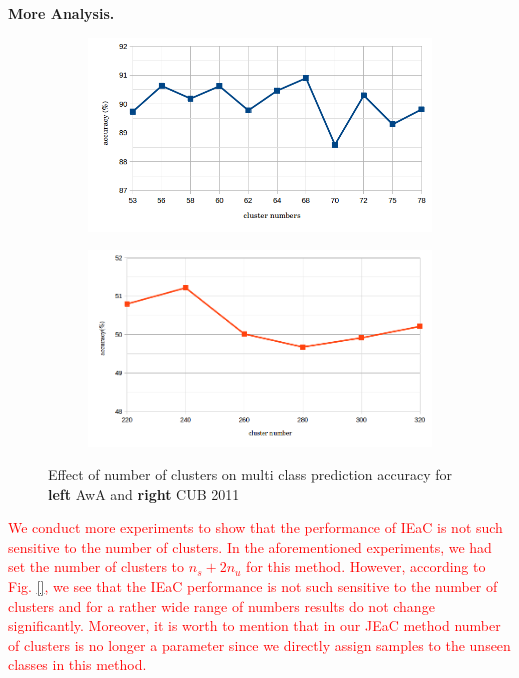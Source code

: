 \documentclass[10pt,twocolumn,letterpaper]{article}
\begin{document}
\textbf{More Analysis.}
\begin{figure}[t]
  \centering
  \begin{subfigure}[b]{0.95\linewidth}
    \includegraphics[width=\linewidth]{ff.png}
    \label{fig:null}
  \end{subfigure}
%
  \begin{subfigure}[b]{0.95\linewidth}
    \includegraphics[width=\linewidth]{gg.png}
    \label{fig:truth}
  \end{subfigure}
  \caption{ Effect of number of clusters on multi class prediction accuracy for
  \textbf{left} AwA and \textbf{right} CUB 2011}
\end{figure}
\textcolor{red}{
We conduct more experiments to show that the performance of IEaC is not such sensitive to the number of clusters.
 In the aforementioned experiments, we had set the number of clusters to $n_s+2n_u$ for this method.
  However, according to Fig. \ref{}, we see that the IEaC performance is not such sensitive to the number of clusters and for a rather wide range of
   numbers results do not change significantly.
    Moreover, it is worth to mention that in our JEaC method number of clusters is no longer a parameter
     since we directly assign samples to the unseen classes in this method.
}
\end{document}
